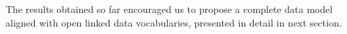 
The results obtained so far encouraged us to propose a complete data
model aligned with open linked data vocabularies, presented in detail
in next section.





